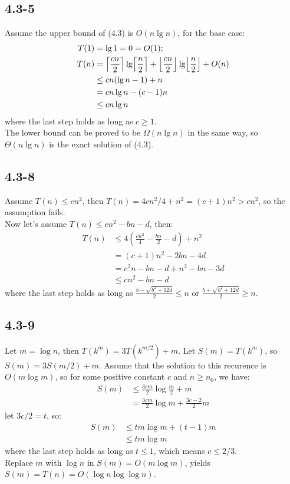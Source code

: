 \subsection{4.3-5}
    Assume the upper bound of (4.3) is $O(n\lg n)$, for the base case:
    \begin{align*}
        T(1) & = \lg 1 = 0 = O(1); \\
        T(n) & = \ceil[\Big]{\frac{cn}{2}}\lg \ceil[\Big]{\frac{n}{2}} +
                 \floor[\Big]{\frac{cn}{2}} \lg \floor[\Big]{\frac{n}{2}} +
                 O(n) \\
             & \le cn(\lg n - 1) + n \\
             & = cn\lg n - (c - 1)n \\
             & \le cn\lg n
    \end{align*}
    where the last step holds as long as $c \ge 1$. \\
    The lower bound can be proved to be $\Omega(n\lg n)$ in the same way, so
    $\Theta(n\lg n)$ is the exact solution of (4.3).
\subsection{4.3-8}
    Assume $T(n) \le cn^2$, then $T(n) = 4cn^2 / 4 + n^2 = (c+1)n^2 > cn^2$,
    so the assumption fails. \\
    Now let's assume $T(n) \le cn^2 - bn - d$, then:
    \begin{align*}
        T(n) & \le 4(\frac{cn^2}{4} - \frac{bn}{2}- d) + n^2 \\
             & = (c+1)n^2 - 2bn - 4d \\
             & = c^2n - bn - d + n^2 - bn - 3d \\
             & \le cn^2 - bn - d
    \end{align*}
    where the last step holds as long as
    $\frac{b-\sqrt{b^2+12d}}{2} \le n$ or $\frac{b+\sqrt{b^2+12d}}{2} \ge n$.
\subsection{4.3-9}
    Let $m = \log n$, then $T(k^m) = 3T(k^{m/2}) + m$. Let $S(m) = T(k^m)$, so
    $S(m) = 3S(m/2) + m$. Assume that the solution to this recurence is
    $O(m\log m)$, so for some positive constant $c$ and $n \ge n_0$, we have:
    \begin{align*}
        S(m) & \le \frac{3cm}{2}\log\frac{m}{2} + m \\
             & = \frac{3cm}{2}\log m + \frac{3c-2}{2}m
    \end{align*}
    let $3c/2 = t$, so:
    \begin{align*}
        S(m) & \le tm\log m + (t-1)m \\
             & \le tm\log m
    \end{align*}
    where the last step holds as long as $t \le 1$, which means $c \le 2/3$. \\
    Replace $m$ with $\log n$ in $S(m) = O(m\log m)$, yields
    $S(m) = T(n) = O(\log n \log \log n)$.
